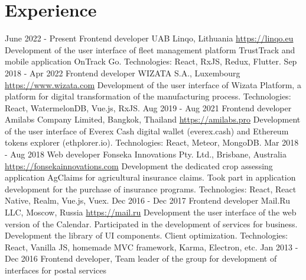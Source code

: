 \documentclass[11pt,a4paper]{moderncv}
\begin{document}
\newpage

\section{Experience}
\cventry
  {June 2022 - Present}
  {Frontend developer}
  {UAB Linqo, Lithuania}
  {\newline{}\url{https://linqo.eu}}{}
  {Development of the user interface of fleet management platform TrustTrack and mobile application OnTrack Go.\newline{}
  Technologies: React, RxJS, Redux, Flutter.}
\cventry
  {Sep 2018 - Apr 2022}
  {Frontend developer}
  {WIZATA S.A., Luxembourg}
  {\newline{}\url{https://www.wizata.com}}{}
  {Development of the user interface of Wizata Platform, a platform for digital transformation of the manufacturing process.\newline{}
  Technologies: React, WatermelonDB, Vue.js, RxJS.}
\cventry
  {Aug 2019 - Aug 2021}
  {Frontend developer}
  {Amilabs Company Limited, Bangkok, Thailand}
  {\newline{}\url{https://amilabs.pro}}{}
  {Development of the user interface of Everex Cash digital wallet (everex.cash) and Ethereum tokens explorer (ethplorer.io).\newline{}
  Technologies: React, Meteor, MongoDB.}
\cventry
  {Mar 2018 - Aug 2018}
  {Web developer}
  {Fonseka Innovations Pty. Ltd., Brisbane, Australia}
  {\newline{}\url{https://fonsekainnovations.com}}{}
  {Development the dedicated crop assessing application AgClaims for agricultural insurance claims.\newline{}
  Took part in application development for the purchase of insurance programs.\newline{}
  Technologies: React, React Native, Realm, Vue.js, Vuex.}
\cventry
  {Dec 2016 - Dec 2017}
  {Frontend developer}
  {Mail.Ru LLC, Moscow, Russia}
  {\newline{}\url{https://mail.ru}}{}
  {Development the user interface of the web version of the Calendar.\newline{}
  Participated in the development of services for business.\newline{}
  Development the library of UI components. Client optimization.\newline{}
  Technologies: React, Vanilla JS, homemade MVC framework, Karma, Electron, etc.}
\cventry
  {Jan 2013 - Dec 2016}
  {Frontend developer, Team leader of the group for development of interfaces for postal services}
\end{document}
